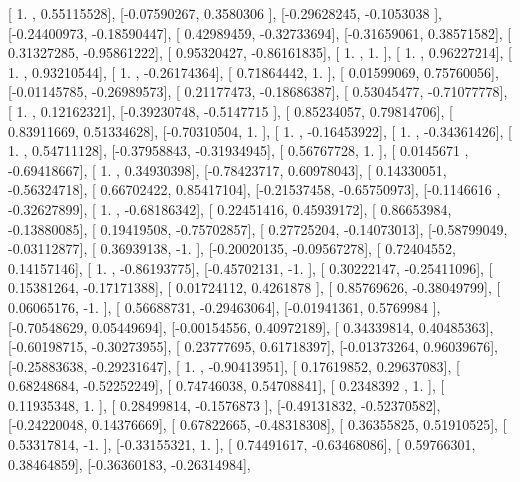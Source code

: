 \documentclass{article}
\begin{document}
       [ 1.        ,  0.55115528],
       [-0.07590267,  0.3580306 ],
       [-0.29628245, -0.1053038 ],
       [-0.24400973, -0.18590447],
       [ 0.42989459, -0.32733694],
       [-0.31659061,  0.38571582],
       [ 0.31327285, -0.95861222],
       [ 0.95320427, -0.86161835],
       [ 1.        ,  1.        ],
       [ 1.        ,  0.96227214],
       [ 1.        ,  0.93210544],
       [ 1.        , -0.26174364],
       [ 0.71864442,  1.        ],
       [ 0.01599069,  0.75760056],
       [-0.01145785, -0.26989573],
       [ 0.21177473, -0.18686387],
       [ 0.53045477, -0.71077778],
       [ 1.        ,  0.12162321],
       [-0.39230748, -0.5147715 ],
       [ 0.85234057,  0.79814706],
       [ 0.83911669,  0.51334628],
       [-0.70310504,  1.        ],
       [ 1.        , -0.16453922],
       [ 1.        , -0.34361426],
       [ 1.        ,  0.54711128],
       [-0.37958843, -0.31934945],
       [ 0.56767728,  1.        ],
       [ 0.0145671 , -0.69418667],
       [ 1.        ,  0.34930398],
       [-0.78423717,  0.60978043],
       [ 0.14330051, -0.56324718],
       [ 0.66702422,  0.85417104],
       [-0.21537458, -0.65750973],
       [-0.1146616 , -0.32627899],
       [ 1.        , -0.68186342],
       [ 0.22451416,  0.45939172],
       [ 0.86653984, -0.13880085],
       [ 0.19419508, -0.75702857],
       [ 0.27725204, -0.14073013],
       [-0.58799049, -0.03112877],
       [ 0.36939138, -1.        ],
       [-0.20020135, -0.09567278],
       [ 0.72404552,  0.14157146],
       [ 1.        , -0.86193775],
       [-0.45702131, -1.        ],
       [ 0.30222147, -0.25411096],
       [ 0.15381264, -0.17171388],
       [ 0.01724112,  0.4261878 ],
       [ 0.85769626, -0.38049799],
       [ 0.06065176, -1.        ],
       [ 0.56688731, -0.29463064],
       [-0.01941361,  0.5769984 ],
       [-0.70548629,  0.05449694],
       [-0.00154556,  0.40972189],
       [ 0.34339814,  0.40485363],
       [-0.60198715, -0.30273955],
       [ 0.23777695,  0.61718397],
       [-0.01373264,  0.96039676],
       [-0.25883638, -0.29231647],
       [ 1.        , -0.90413951],
       [ 0.17619852,  0.29637083],
       [ 0.68248684, -0.52252249],
       [ 0.74746038,  0.54708841],
       [ 0.2348392 ,  1.        ],
       [ 0.11935348,  1.        ],
       [ 0.28499814, -0.1576873 ],
       [-0.49131832, -0.52370582],
       [-0.24220048,  0.14376669],
       [ 0.67822665, -0.48318308],
       [ 0.36355825,  0.51910525],
       [ 0.53317814, -1.        ],
       [-0.33155321,  1.        ],
       [ 0.74491617, -0.63468086],
       [ 0.59766301,  0.38464859],
       [-0.36360183, -0.26314984],
\end{document}
